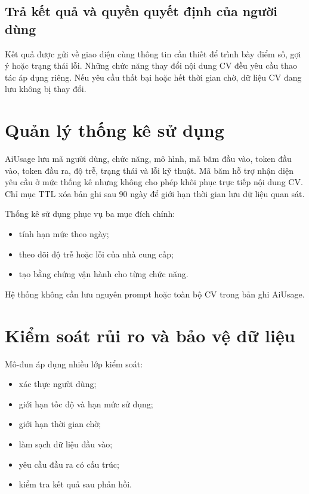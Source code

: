 \subsection{Trả kết quả và quyền quyết định của người dùng}

Kết quả được gửi về giao diện cùng thông tin cần thiết để trình bày điểm số, gợi ý hoặc trạng thái lỗi. Những chức năng thay đổi nội dung CV đều yêu cầu thao tác áp dụng riêng. Nếu yêu cầu thất bại hoặc hết thời gian chờ, dữ liệu CV đang lưu không bị thay đổi.

\section{Quản lý thống kê sử dụng}

AiUsage lưu mã người dùng, chức năng, mô hình, mã băm đầu vào, token đầu vào, token đầu ra, độ trễ, trạng thái và lỗi kỹ thuật. Mã băm hỗ trợ nhận diện yêu cầu ở mức thống kê nhưng không cho phép khôi phục trực tiếp nội dung CV. Chỉ mục TTL xóa bản ghi sau 90 ngày để giới hạn thời gian lưu dữ liệu quan sát.

Thống kê sử dụng phục vụ ba mục đích chính:

\begin{itemize}
    \item tính hạn mức theo ngày;
    \item theo dõi độ trễ hoặc lỗi của nhà cung cấp;
    \item tạo bằng chứng vận hành cho từng chức năng.
\end{itemize}

Hệ thống không cần lưu nguyên prompt hoặc toàn bộ CV trong bản ghi AiUsage.

\section{Kiểm soát rủi ro và bảo vệ dữ liệu}

Mô-đun áp dụng nhiều lớp kiểm soát:

\begin{itemize}
    \item xác thực người dùng;
    \item giới hạn tốc độ và hạn mức sử dụng;
    \item giới hạn thời gian chờ;
    \item làm sạch dữ liệu đầu vào;
    \item yêu cầu đầu ra có cấu trúc;
    \item kiểm tra kết quả sau phản hồi.
\end{itemize}

